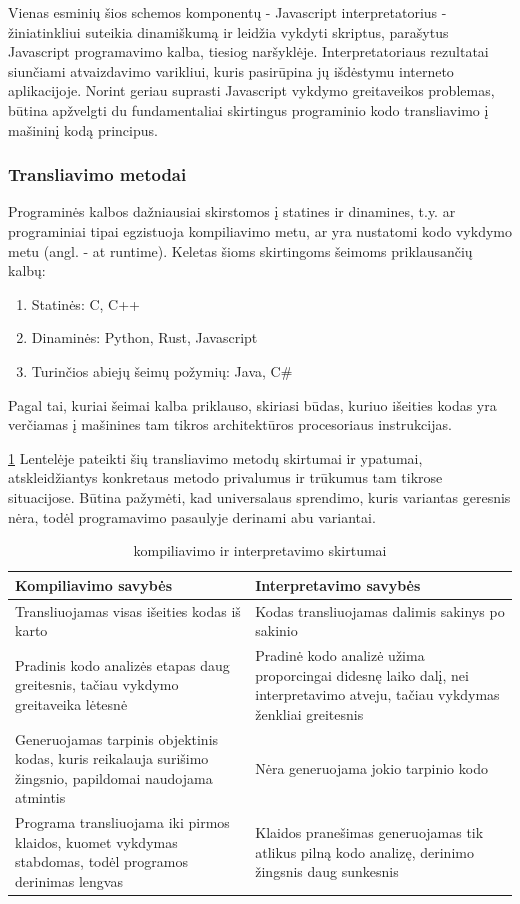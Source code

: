 \documentclass{VUMIFPSkursinis}
\begin{document}
Vienas esminių šios schemos komponentų - Javascript interpretatorius - žiniatinkliui suteikia dinamiškumą ir leidžia vykdyti skriptus, parašytus Javascript programavimo kalba, tiesiog naršyklėje. Interpretatoriaus rezultatai siunčiami atvaizdavimo varikliui, kuris pasirūpina jų išdėstymu interneto aplikacijoje. Norint geriau suprasti Javascript vykdymo greitaveikos problemas, būtina apžvelgti du fundamentaliai skirtingus programinio kodo transliavimo į mašininį kodą principus.

\subsubsection{Transliavimo metodai}
Programinės kalbos dažniausiai skirstomos į statines ir dinamines, t.y. ar programiniai tipai egzistuoja kompiliavimo metu, ar yra nustatomi kodo vykdymo metu (angl. - at runtime). Keletas šioms skirtingoms šeimoms priklausančių kalbų:
\begin{enumerate}
    \item Statinės: C, C++
    \item Dinaminės: Python, Rust, Javascript
    \item Turinčios abiejų šeimų požymių: Java, C\#
\end{enumerate}

Pagal tai, kuriai šeimai kalba priklauso, skiriasi būdas, kuriuo išeities kodas yra verčiamas į mašinines tam tikros architektūros procesoriaus instrukcijas.

\ref{tab:kompiliavimas_interpretavimas} Lentelėje pateikti šių transliavimo metodų skirtumai ir ypatumai, atskleidžiantys konkretaus metodo privalumus ir trūkumus tam tikrose situacijose. Būtina pažymėti, kad universalaus sprendimo, kuris variantas geresnis nėra, todėl programavimo pasaulyje derinami abu variantai.

\begin{table}[H]
  \centering
  \caption{kompiliavimo ir interpretavimo skirtumai}
  {\begin{tabular}{|m{13em}|m{13em}|} \hline
     Kompiliavimo savybės & Interpretavimo savybės \\
    \hline
    Transliuojamas visas išeities kodas iš karto & Kodas transliuojamas dalimis 
 sakinys po sakinio \\
 \hline
     Pradinis kodo analizės etapas daug greitesnis, 
     tačiau vykdymo greitaveika lėtesnė  & Pradinė kodo analizė 
     užima proporcingai didesnę laiko dalį, nei interpretavimo atveju, 
     tačiau vykdymas ženkliai greitesnis  \\
    \hline
     Generuojamas tarpinis objektinis kodas, kuris
 reikalauja surišimo žingsnio, papildomai naudojama atmintis & Nėra generuojama jokio tarpinio kodo \\
 \hline
 Programa transliuojama iki pirmos klaidos, kuomet 
 vykdymas stabdomas, todėl programos derinimas lengvas & Klaidos pranešimas 
 generuojamas tik atlikus pilną kodo analizę, derinimo žingsnis daug sunkesnis \\
 \hline
  \end{tabular}}
  \label{tab:kompiliavimas_interpretavimas}
\end{table}
\end{document}

